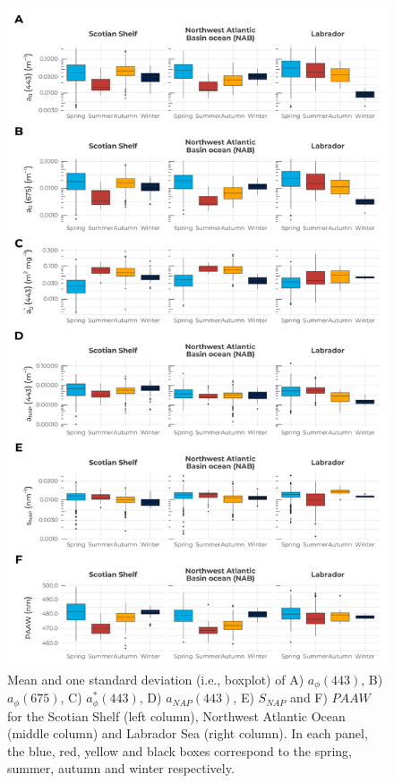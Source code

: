 \documentclass[utf8]{frontiersSCNS} %
\begin{document}
\begin{figure}[h!]
\begin{center}
\includegraphics[width=12cm]{fig02.pdf}
\end{center}
\caption{Mean and one standard deviation (i.e., boxplot) of A) $a_\phi(443)$, B)$a_\phi(675)$, C) $a^*_\phi(443)$, D) $a_{NAP}(443)$, E) $S_{NAP}$ and F) $PAAW$ for the Scotian Shelf (left column), Northwest Atlantic Ocean (middle column) and Labrador Sea (right column). In each panel, the blue, red, yellow and black boxes correspond to the spring, summer, autumn and winter respectively. }\label{fig:2}
\end{figure}
\end{document}
